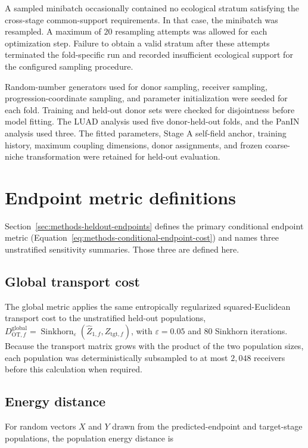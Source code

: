 A sampled minibatch occasionally contained no ecological stratum satisfying
the cross-stage common-support requirements. In that case, the minibatch was resampled. A maximum of \(20\) resampling attempts was allowed for each
optimization step. Failure to obtain a valid stratum after these attempts
terminated the fold-specific run and recorded insufficient ecological support for the configured sampling procedure.

Random-number generators used for donor sampling, receiver sampling,
progression-coordinate sampling, and parameter initialization were seeded for each fold. Training and held-out donor sets were checked for disjointness before model fitting. The LUAD analysis used five donor-held-out folds, and the PanIN analysis used three. The fitted parameters, Stage A self-field anchor, training history, maximum coupling dimensions, donor assignments, and frozen coarse-niche transformation were retained for held-out evaluation.


\section{Endpoint metric definitions}
\label{sec:app-b-metrics}

Section~\ref{sec:methods-heldout-endpoints} defines the primary conditional
endpoint metric (Equation~\ref{eq:methods-conditional-endpoint-cost}) and names
three unstratified sensitivity summaries. Those three are defined here.

\subsection*{Global transport cost}

The global metric applies the same entropically regularized squared-Euclidean
transport cost to the unstratified held-out populations,
$D_{\mathrm{OT},f}^{\mathrm{global}} = \operatorname{Sinkhorn}_{\varepsilon}
(\widehat{Z}_{1,f}, Z_{\mathrm{tgt},f})$,
with $\varepsilon = 0.05$ and $80$ Sinkhorn iterations. Because the transport
matrix grows with the product of the two population sizes, each population was
deterministically subsampled to at most $2{,}048$ receivers before this
calculation when required.

\subsection*{Energy distance}

For random vectors $X$ and $Y$ drawn from the predicted-endpoint and
target-stage populations, the population energy distance is

